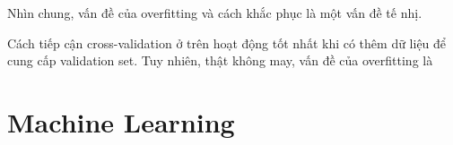 Nhìn chung, vấn đề của overfitting và cách khắc phục là một vấn đề tế nhị.

Cách tiếp cận cross-validation ở trên hoạt động tốt nhất khi có thêm dữ liệu để cung cấp validation set. Tuy nhiên, thật không may, vấn đề của overfitting là

\section{Machine Learning}

